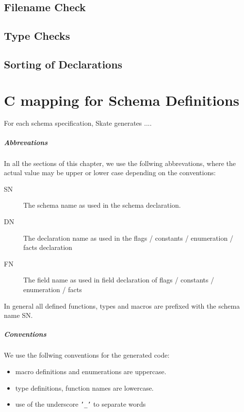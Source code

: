 \documentclass[a4paper,11pt,twoside]{report}
\begin{document}
{{\section{Filename Check}

\section{Type Checks}

\section{Sorting of Declarations}


\chapter{C mapping for Schema Definitions}
\label{chap:cmapping}

For each schema specification, Skate generates ....

\paragraph{Abbrevations}
In all the sections of this chapter, we use the follwing abbrevations, where 
the actual value may be upper or lower case depending on the conventions:

\begin{description}
  \item[SN] The schema name as used in the schema declaration.
  \item[DN] The declaration name as used in the flags / constants / 
            enumeration / facts declaration
  \item[FN] The field name as used in field declaration of flags / constants / 
            enumeration / facts
\end{description}

In general all defined functions, types and macros are prefixed with the schema
name SN.

\paragraph{Conventions}
We use the follwing conventions for the generated code:
\begin{itemize}
  \item macro definitions and enumerations are uppercase.
  \item type definitions, function names are lowercase.
  \item use of the underscore \texttt{'\_'} to separate words
\end{itemize}

}}
\end{document}
